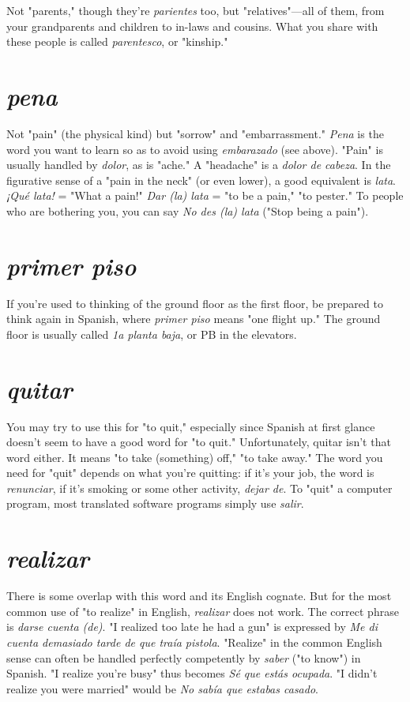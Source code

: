 \documentclass[14pt,a4paper,oneside]{memoir}
\begin{document}
Not "parents," though they're \emph{parientes} too, but
"relatives"---all of them, from your grandparents and children to in-laws and cousins. What you share with these people is called \emph{parentesco}, or "kinship."

\section{\emph{pena}}

Not "pain" (the physical kind) but "sorrow" and "embarrassment." \emph{Pena} is the word you want to learn so as to avoid using
\emph{embarazado} (see above). "Pain" is usually handled by \emph{dolor}, as is
"ache." A "headache" is a \emph{dolor de cabeza}. In the figurative sense of
a "pain in the neck" (or even lower), a good equivalent is \emph{lata}. \emph{¡Qué
	lata!} = "What a pain!" \emph{Dar (la) lata} = "to be a pain," "to pester." To
people who are bothering you, you can say \emph{No des (la) lata} ("Stop being a pain").

\section{\emph{primer piso}}

If you're used to thinking of the ground floor as
the first floor, be prepared to think again in Spanish, where \emph{primer piso}
means "one flight up." The ground floor is usually called \emph{1a planta
	baja}, or PB in the elevators.

\section{\emph{quitar}}

You may try to use this for "to quit," especially
since Spanish at first glance doesn't seem to have a good word for "to
quit." Unfortunately, quitar isn't that word either. It means "to take
(something) off," "to take away." The word you need for "quit" depends on what you're quitting: if it's your job, the word is \emph{renunciar}, if
it's smoking or some other activity, \emph{dejar de}. To "quit" a computer
program, most translated software programs simply use \emph{salir}.

\section{\emph{realizar}}

There is some overlap with this word and its English cognate. But for the most common use of "to realize" in English,
\emph{realizar} does not work. The correct phrase is \emph{darse cuenta (de)}. "I realized too late he had a gun" is expressed by \emph{Me di cuenta demasiado
	tarde de que traía pistola}. "Realize" in the common English sense can
often be handled perfectly competently by \emph{saber} ("to know") in Spanish. "I realize you're busy" thus becomes \emph{Sé que estás ocupada}. "I
didn't realize you were married" would be \emph{No sabía que estabas
	casado}.
\end{document}
